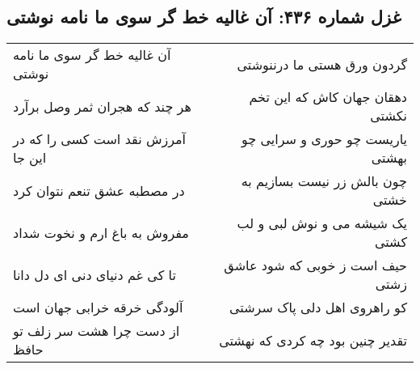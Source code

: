 \begin{center}
\section*{غزل شماره ۴۳۶: آن غالیه خط گر سوی ما نامه نوشتی}
\label{sec:sh436}
\begin{longtable}{l p{0.5cm} r}
آن غالیه خط گر سوی ما نامه نوشتی
&&
گردون ورق هستی ما درننوشتی
\\
هر چند که هجران ثمر وصل برآرد
&&
دهقان جهان کاش که این تخم نکشتی
\\
آمرزش نقد است کسی را که در این جا
&&
یاریست چو حوری و سرایی چو بهشتی
\\
در مصطبه عشق تنعم نتوان کرد
&&
چون بالش زر نیست بسازیم به خشتی
\\
مفروش به باغ ارم و نخوت شداد
&&
یک شیشه می و نوش لبی و لب کشتی
\\
تا کی غم دنیای دنی ای دل دانا
&&
حیف است ز خوبی که شود عاشق زشتی
\\
آلودگی خرقه خرابی جهان است
&&
کو راهروی اهل دلی پاک سرشتی
\\
از دست چرا هشت سر زلف تو حافظ
&&
تقدیر چنین بود چه کردی که نهشتی
\\
\end{longtable}
\end{center}
